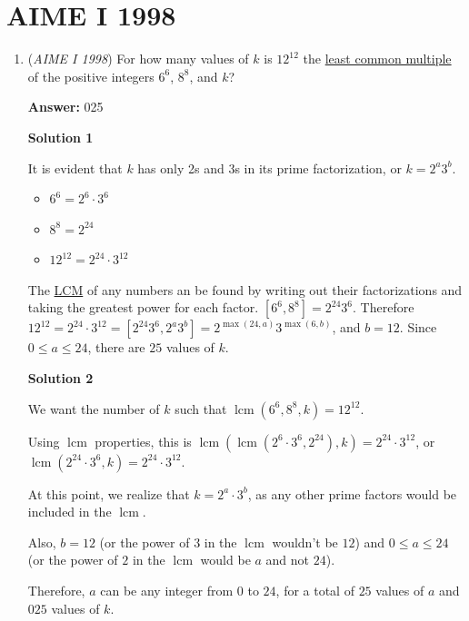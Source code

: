 \section{AIME I 1998}
        \begin{enumerate}
        	\item (\textit{AIME I 1998}) For how many values of $k$ is $12^{12}$ the \href{https://artofproblemsolving.com/wiki/index.php?title=Least\_common\_multiple}{least common multiple} of the positive integers $6^6$, $8^8$, and $k$?


 
 \textbf{Answer: }025



\textbf{Solution 1}

It is evident that $k$ has only 2s and 3s in its prime factorization, or $k = 2^a3^b$. 

 
            \begin{itemize}
        \item $6^6 = 2^6\cdot3^6$
        \item $8^8 = 2^{24}$
        \item $12^{12} = 2^{24}\cdot3^{12}$
            \end{itemize}
            The \href{https://artofproblemsolving.com/wiki/index.php?title=LCM}{LCM} of any numbers an be found by writing out their factorizations and taking the greatest power for each factor. $[6^6,8^8] = 2^{24}3^6$. Therefore $12^{12} = 2^{24}\cdot3^{12} = [2^{24}3^6,2^a3^b] = 2^{\max(24,a)}3^{\max(6,b)}$, and $b = 12$.  Since $0 \le a \le 24$, there are $\boxed{25}$ values of $k$.

 



\textbf{Solution 2}

We want the number of $k$ such that $\operatorname{lcm}(6^6,8^8,k)=12^{12}$.

 Using $\operatorname{lcm}$ properties, this is $\operatorname{lcm}(\operatorname{lcm}(2^6\cdot 3^6,2^{24}),k)=2^{24} \cdot 3^{12}$, or $\operatorname{lcm}(2^{24}\cdot 3^6,k)=2^{24}\cdot 3^{12}$.

 At this point, we realize that $k=2^a\cdot3^b$, as any other prime factors would be included in the $\operatorname{lcm}$. 

 Also, $b=12$ (or the power of $3$ in the $\operatorname{lcm}$ wouldn't be $12$) and $0\le a\le 24$ (or the power of $2$ in the $\operatorname{lcm}$ would be $a$ and not $24$).

 Therefore, $a$ can be any integer from $0$ to $24$, for a total of $25$ values of $a$ and $\boxed{025}$ values of $k$. 


\end{enumerate}
